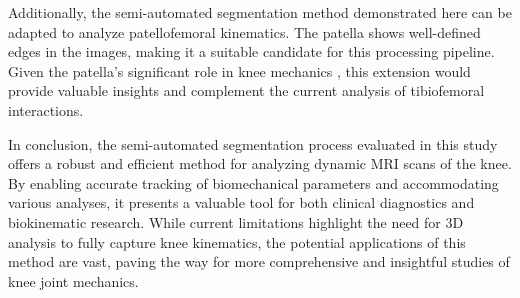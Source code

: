 \documentclass{micro-econ-thesis}
\begin{document}
Additionally, the semi-automated segmentation method demonstrated here can be adapted to analyze patellofemoral kinematics. The patella shows well-defined edges in the images, making it a suitable candidate for this processing pipeline. Given the patella's significant role in knee mechanics \parencite{powers_evidence-based_2017}, this extension would provide valuable insights and complement the current analysis of tibiofemoral interactions.

In conclusion, the semi-automated segmentation process evaluated in this study offers a robust and efficient method for analyzing dynamic MRI scans of the knee. By enabling accurate tracking of biomechanical parameters and accommodating various analyses, it presents a valuable tool for both clinical diagnostics and biokinematic research. While current limitations highlight the need for 3D analysis to fully capture knee kinematics, the potential applications of this method are vast, paving the way for more comprehensive and insightful studies of knee joint mechanics.
\cleardoublepage
{}
{} %
\printbibliography

%
%
%
%



\end{document}
